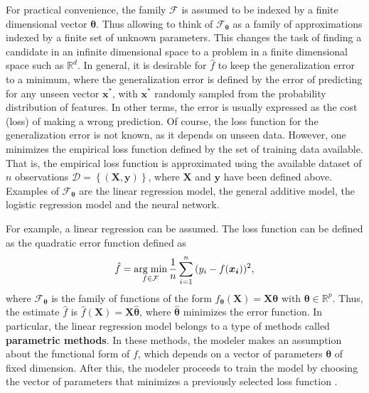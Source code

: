 For practical convenience, the family $\mathcal{F}$ is assumed to be indexed by a finite dimensional vector $\boldsymbol{\theta}$. Thus allowing to think of $\mathcal{F}_{\boldsymbol{\theta}}$ as a family of approximations indexed by a finite set of unknown parameters. This changes the task of finding a candidate in an infinite dimensional space to a problem in a finite dimensional space such as $\mathbb{R}^d$.
In general, it is desirable for $\hat{f}$ to keep the generalization error to a minimum, where the generalization error is defined by the error of predicting for any unseen vector $\boldsymbol{x}^*$, with $\boldsymbol{x}^*$ randomly sampled from the probability distribution of features. In other terms, the error is usually expressed as the cost (loss) of making a wrong prediction.
Of course, the loss function for the generalization error is not known, as it depends on unseen data. However, one minimizes the empirical loss function defined by the set of training data available. That is, the empirical loss function is approximated using the available dataset of $n$ observations $\mathcal{D} = \left\{ (\boldsymbol{X}, \boldsymbol{y}) \right\}$, where $\boldsymbol{X}$ and $\boldsymbol{y}$ have been defined above.
Examples of $\mathcal{F}_{\boldsymbol{\theta}}$ are the linear regression model, the general additive model, the logistic regression model and the neural network.

For example, a linear regression can be assumed. The loss function can be defined as the quadratic error function defined as
\begin{equation}
  \hat{f} = \operatorname*{arg\; min}_{f \in \mathcal{F}} \frac{1}{n} \sum_{i = 1}^n{ ( y_i - f(\boldsymbol{x_i}) ) ^ 2},
\end{equation}
where $\mathcal{F}_{\boldsymbol{\theta}}$ is the family of functions of the form $f_{\boldsymbol{\theta}}(\boldsymbol{X}) = \boldsymbol{X}\boldsymbol{\theta}$ with $\boldsymbol{\theta} \in \mathbb{R}^p$. Thus, the  estimate $\hat{f}$ is $\hat{f}(\boldsymbol{X}) = \boldsymbol{X} \hat{\boldsymbol{\theta}}$, where $\hat{\boldsymbol{\theta}}$ minimizes the error function.
In particular, the linear regression model belongs to a type of methods called \textbf{parametric methods}. In these methods, the modeler makes an assumption about the functional form of $f$, which depends on a vector of parameters $\boldsymbol{\theta}$ of fixed dimension. After this, the modeler proceeds to train the model by choosing the vector of parameters that minimizes a previously selected loss function \cite[p.~21]{james2013introduction}.

